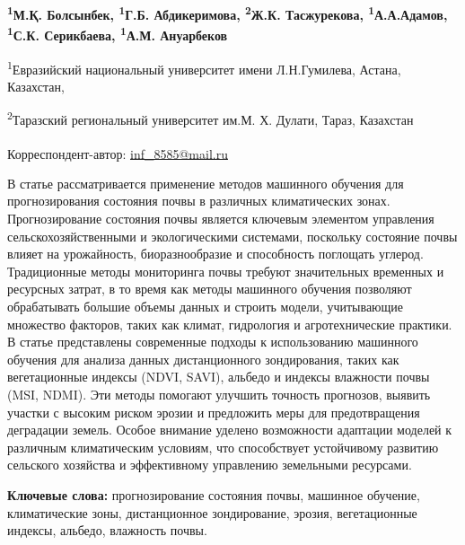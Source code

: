 
\begin{articleheader}

{\bfseries
\textsuperscript{1}М.Қ. Болсынбек,
\textsuperscript{1}Г.Б. Абдикеримова,
\textsuperscript{2}Ж.К. Тасжурекова,
\textsuperscript{1}А.А.Адамов,
\textsuperscript{1}С.К. Серикбаева\textsuperscript{\envelope },
\textsuperscript{1}А.М. Ануарбеков
}
\end{articleheader}

\begin{affiliation}
\textsuperscript{1}Евразийский национальный университет имени Л.Н.Гумилева, Астана, Казахстан,

\textsuperscript{2}Таразский региональный университет им.М. Х. Дулати, Тараз, Казахстан

\raggedright \textsuperscript{\envelope }Корреспондент-автор: \href{mailto:inf\_8585@mail.ru}{inf\_8585@mail.ru}
\end{affiliation}

В статье рассматривается применение методов машинного обучения для
прогнозирования состояния почвы в различных климатических зонах.
Прогнозирование состояния почвы является ключевым элементом управления
сельскохозяйственными и экологическими системами, поскольку состояние
почвы влияет на урожайность, биоразнообразие и способность поглощать
углерод. Традиционные методы мониторинга почвы требуют значительных
временных и ресурсных затрат, в то время как методы машинного обучения
позволяют обрабатывать большие объемы данных и строить модели,
учитывающие множество факторов, таких как климат, гидрология и
агротехнические практики. В статье представлены современные подходы к
использованию машинного обучения для анализа данных дистанционного
зондирования, таких как вегетационные индексы (NDVI, SAVI), альбедо и
индексы влажности почвы (MSI, NDMI). Эти методы помогают улучшить
точность прогнозов, выявить участки с высоким риском эрозии и предложить
меры для предотвращения деградации земель. Особое внимание уделено
возможности адаптации моделей к различным климатическим условиям, что
способствует устойчивому развитию сельского хозяйства и эффективному
управлению земельными ресурсами.

{\bfseries Ключевые слова:} прогнозирование состояния почвы, машинное
обучение, климатические зоны, дистанционное зондирование, эрозия,
вегетационные индексы, альбедо, влажность почвы.

